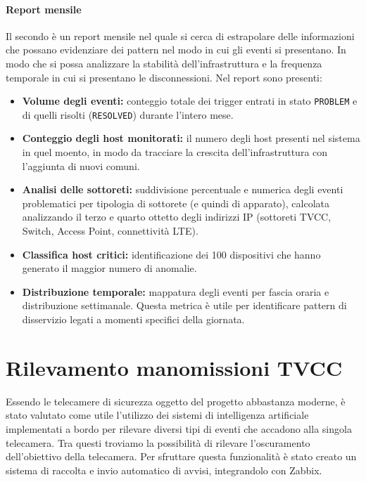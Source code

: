 \documentclass[12pt, a4paper, oneside]{report}
\begin{document}
\subsubsection{Report mensile}
Il secondo è un report mensile nel quale si cerca di estrapolare delle informazioni che possano evidenziare dei pattern nel modo in cui gli eventi si presentano. In modo che si possa analizzare la stabilità dell'infrastruttura e la frequenza temporale in cui si presentano le disconnessioni.
Nel report sono presenti:
\begin{itemize}
    \item \textbf{Volume degli eventi:} conteggio totale dei trigger entrati in stato \texttt{PROBLEM}
          e di quelli risolti (\texttt{RESOLVED}) durante l'intero mese.
    \item \textbf{Conteggio degli host monitorati:} il numero degli host presenti nel sistema in quel moento, in modo da tracciare la crescita dell'infrastruttura con l'aggiunta di nuovi comuni.
    \item \textbf{Analisi delle sottoreti:} suddivisione percentuale e numerica degli eventi problematici per tipologia di sottorete (e quindi di apparato),
          calcolata analizzando il terzo e quarto ottetto degli indirizzi IP (sottoreti TVCC, Switch, Access Point, connettività LTE).
    \item \textbf{Classifica host critici:} identificazione dei 100 dispositivi
          che hanno generato il maggior numero di anomalie.
    \item \textbf{Distribuzione temporale:} mappatura degli eventi per fascia oraria e distribuzione settimanale.
          Questa metrica è utile per identificare pattern di disservizio legati a momenti specifici della giornata.
\end{itemize}

\chapter{Rilevamento manomissioni TVCC}
Essendo le telecamere di sicurezza oggetto del progetto abbastanza moderne, è stato valutato come utile l'utilizzo dei sistemi di
intelligenza artificiale implementati a bordo per rilevare diversi tipi di eventi che accadono alla singola telecamera.
Tra questi troviamo la possibilità di rilevare l'oscuramento dell'obiettivo della telecamera.
Per sfruttare questa funzionalità è stato creato un sistema di raccolta e invio automatico di avvisi, integrandolo con Zabbix.
\end{document}
